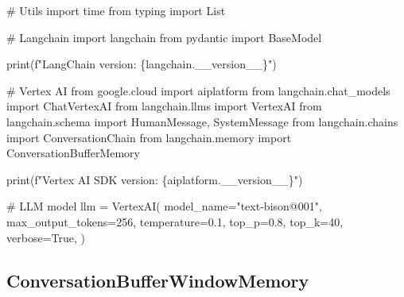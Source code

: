 \documentclass[
  letterpaper,
  DIV=11,
  numbers=noendperiod]{scrreprt}
\newenvironment{Shaded}{\begin{snugshade}}{\end{snugshade}}
\newcommand{\BuiltInTok}[1]{\textcolor[rgb]{0.00,0.23,0.31}{#1}}
\newcommand{\CommentTok}[1]{\textcolor[rgb]{0.37,0.37,0.37}{#1}}
\newcommand{\DecValTok}[1]{\textcolor[rgb]{0.68,0.00,0.00}{#1}}
\newcommand{\FloatTok}[1]{\textcolor[rgb]{0.68,0.00,0.00}{#1}}
\newcommand{\ImportTok}[1]{\textcolor[rgb]{0.00,0.46,0.62}{#1}}
\newcommand{\NormalTok}[1]{\textcolor[rgb]{0.00,0.23,0.31}{#1}}
\newcommand{\OperatorTok}[1]{\textcolor[rgb]{0.37,0.37,0.37}{#1}}
\newcommand{\SpecialCharTok}[1]{\textcolor[rgb]{0.37,0.37,0.37}{#1}}
\newcommand{\SpecialStringTok}[1]{\textcolor[rgb]{0.13,0.47,0.30}{#1}}
\newcommand{\StringTok}[1]{\textcolor[rgb]{0.13,0.47,0.30}{#1}}
\newcommand{\VariableTok}[1]{\textcolor[rgb]{0.07,0.07,0.07}{#1}}
\begin{document}
\begin{Shaded}
\begin{Highlighting}[]
\CommentTok{\# Utils}
\ImportTok{import}\NormalTok{ time}
\ImportTok{from}\NormalTok{ typing }\ImportTok{import}\NormalTok{ List}

\CommentTok{\# Langchain}
\ImportTok{import}\NormalTok{ langchain}
\ImportTok{from}\NormalTok{ pydantic }\ImportTok{import}\NormalTok{ BaseModel}

\BuiltInTok{print}\NormalTok{(}\SpecialStringTok{f"LangChain version: }\SpecialCharTok{\{}\NormalTok{langchain}\SpecialCharTok{.}\NormalTok{\_\_version\_\_}\SpecialCharTok{\}}\SpecialStringTok{"}\NormalTok{)}

\CommentTok{\# Vertex AI}
\ImportTok{from}\NormalTok{ google.cloud }\ImportTok{import}\NormalTok{ aiplatform}
\ImportTok{from}\NormalTok{ langchain.chat\_models }\ImportTok{import}\NormalTok{ ChatVertexAI}
\ImportTok{from}\NormalTok{ langchain.llms }\ImportTok{import}\NormalTok{ VertexAI}
\ImportTok{from}\NormalTok{ langchain.schema }\ImportTok{import}\NormalTok{ HumanMessage, SystemMessage}
\ImportTok{from}\NormalTok{ langchain.chains }\ImportTok{import}\NormalTok{ ConversationChain}
\ImportTok{from}\NormalTok{ langchain.memory }\ImportTok{import}\NormalTok{ ConversationBufferMemory}


\BuiltInTok{print}\NormalTok{(}\SpecialStringTok{f"Vertex AI SDK version: }\SpecialCharTok{\{}\NormalTok{aiplatform}\SpecialCharTok{.}\NormalTok{\_\_version\_\_}\SpecialCharTok{\}}\SpecialStringTok{"}\NormalTok{)}
\end{Highlighting}
\end{Shaded}

\begin{Shaded}
\begin{Highlighting}[]
\CommentTok{\# LLM model}
\NormalTok{llm }\OperatorTok{=}\NormalTok{ VertexAI(}
\NormalTok{    model\_name}\OperatorTok{=}\StringTok{"text{-}bison@001"}\NormalTok{,}
\NormalTok{    max\_output\_tokens}\OperatorTok{=}\DecValTok{256}\NormalTok{,}
\NormalTok{    temperature}\OperatorTok{=}\FloatTok{0.1}\NormalTok{,}
\NormalTok{    top\_p}\OperatorTok{=}\FloatTok{0.8}\NormalTok{,}
\NormalTok{    top\_k}\OperatorTok{=}\DecValTok{40}\NormalTok{,}
\NormalTok{    verbose}\OperatorTok{=}\VariableTok{True}\NormalTok{,}
\NormalTok{)}
\end{Highlighting}
\end{Shaded}

\hypertarget{conversationbufferwindowmemory}{%
\subsection{ConversationBufferWindowMemory}\label{conversationbufferwindowmemory}}
\end{document}
